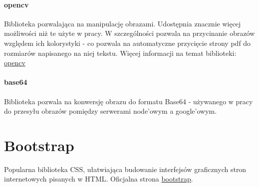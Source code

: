 \paragraph{opencv} Biblioteka pozwalająca na manipulację obrazami. Udostępnia znacznie więcej możliwości niż te użyte w pracy. W szczególności pozwala na przycinanie obrazów względem ich kolorystyki - co pozwala na automatyczne przycięcie strony pdf do rozmiarów napisanego na niej tekstu. Więcej informacji na temat biblioteki: \href{https://pypi.org/project/opencv-python/}{opencv}
\paragraph{base64} Biblioteka pozwala na konwersję obrazu do formatu Base64 - używanego w pracy do przesyłu obrazów pomiędzy serwerami node'owym a google'owym. 

\section{Bootstrap}  
Popularna biblioteka CSS, ułatwiająca budowanie interfejsów graficznych stron internetowych pisanych w HTML. Oficjalna strona \href{https://getbootstrap.com/}{bootstrap}.




